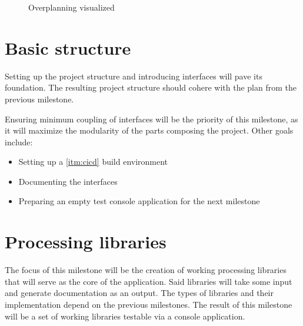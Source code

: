 \begin{figure}[H]
    \centering
    \caption{Overplanning visualized}
    \label{fig:overplanning}
\end{figure}

\section{Basic structure}

Setting up the project structure and introducing interfaces will pave its foundation. The resulting project structure should cohere with the plan from the previous milestone.

Ensuring minimum coupling of interfaces will be the priority of this milestone, as it will maximize the modularity of the parts composing the project.
Other goals include:
\begin{itemize}
    \item Setting up a \ref{itm:cicd} build environment
    \item Documenting the interfaces
    \item Preparing an empty test console application for the next milestone
\end{itemize}

\section{Processing libraries}

The focus of this milestone will be the creation of working processing libraries that will serve as the core of the application. Said libraries will take some input and generate documentation as an output. The types of libraries and their implementation depend on the previous milestones. The result of this milestone will be a set of working libraries testable via a console application.

